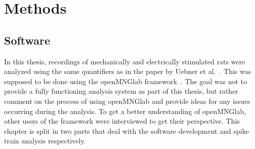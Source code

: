 \chapter{Methods}
\label{methods_chapter}
\begin{comment}
In this chapter I will describe the methods I used for creating the software and spike analysis results in this thesis\\
-Describe the different data structures (Neo, old openMNGlab version)\\
-Detail the development process, issues during development and how they were resolved\\
-Describe the finished analysis pipeline with the help of a simplified graph\\
-present use cases (3 students analysing different data, experimental scientist)\\

Spike Analysis:\\
-Data\\
-definition of spike trains\\
-quantifiers\\

TODO:\\
-Add what I did: somewhat detailed description of my process in developing the notebook\\
-start from the notebook which was started by Radomir for custom structure (before openMNGlab)\\
-adding of importers from old openMNGlab version (code from Fabian)\\
-adding of neo importers after integration into openMNGlab\\
\end{comment}
\section{Software}
In this thesis, recordings of mechanically and electrically stimulated rats were analyzed using the same quantifiers as in the paper by Uebner et al.~\cite{roberto}. This was supposed to be done using the openMNGlab framework~\cite{schlebusch_openmnglab_2021}. The goal was not to provide a fully functioning analysis system as part of this thesis, but rather comment on the process of using openMNGlab and provide ideas for any issues occurring during the analysis. To get a better understanding of openMNGlab, other users of the framework were interviewed to get their perspective.
This chapter is split in two parts that deal with the software development and spike train analysis respectively.

